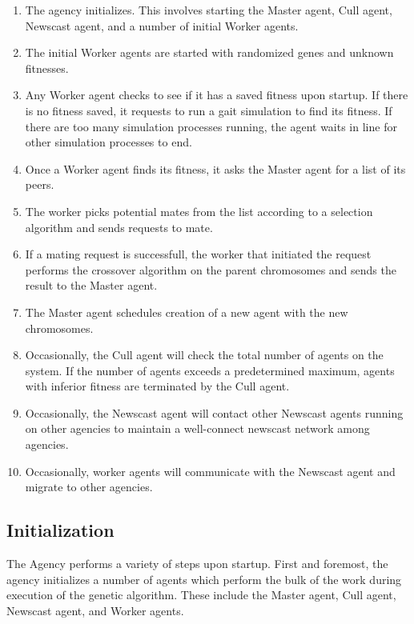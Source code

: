       \begin{enumerate}
        \item The agency initializes. This involves starting the Master agent,
          Cull agent, Newscast agent, and a number of initial Worker agents.
        \item The initial Worker agents are started with randomized genes and 
          unknown fitnesses. 
        \item Any Worker agent checks to see if it has a saved fitness upon
          startup. If there is no fitness saved, it requests to run a gait
          simulation to find its fitness. If there are too many simulation
          processes running, the agent waits in line for other simulation
          processes to end.
        \item Once a Worker agent finds its fitness, it asks the Master agent
          for a list of its peers. 
        \item The worker picks potential mates from the list according to
          a selection algorithm and sends requests to mate. 
        \item If a mating request is successfull, the worker that initiated 
          the request performs the crossover algorithm on the parent chromosomes
          and sends the result to the Master agent.
        \item The Master agent schedules creation of a new agent with the new
          chromosomes.
        \item Occasionally, the Cull agent will check the total number of
          agents on the system. If the number of agents exceeds a predetermined
          maximum, agents with inferior fitness are terminated by the Cull agent.
        \item Occasionally, the Newscast agent will contact other Newscast agents
          running on other agencies to maintain a well-connect newscast network
          among agencies.
        \item Occasionally, worker agents will communicate with the Newscast agent
          and migrate to other agencies.
      \end{enumerate}
      
    \subsection{Initialization} %
      The Agency performs a variety of steps upon startup.
      First and foremost, the agency initializes a number of agents which
        perform the bulk of the work during execution of the genetic algorithm.
      These include the Master agent, Cull agent, Newscast agent, and Worker
        agents.

